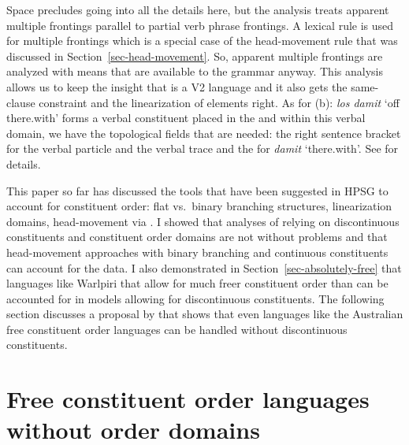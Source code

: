 \documentclass[output=paper
                ,modfonts
                ,nonflat
	        ,collection
	        ,collectionchapter
	        ,collectiontoclongg
 	        ,biblatex
                ,babelshorthands
                ,newtxmath
                ,draftmode
                ,colorlinks, citecolor=brown
]{./langsci/langscibook}
\begin{document}
\zl 
Space precludes going into all the details here, but the analysis treats apparent multiple frontings parallel to
partial verb phrase frontings. A lexical rule is used for multiple frontings which is a special case
of the head-movement rule that was discussed in Section~\ref{sec-head-movement}. So, apparent
multiple frontings are analyzed with means that are available to the grammar anyway. This analysis
allows us to keep the insight that  is a V2 language and it also gets the same-clause constraint
and the linearization of elements right. As for (b): \emph{los damit} `off there.with' forms
a verbal constituent placed in the \vf and within this verbal domain, we have the topological fields that are needed:
the right sentence bracket for the verbal particle and the verbal trace and the \nf for
\emph{damit} `there.with'. See  for details.




This paper so far has discussed the tools that have been suggested in HPSG to account for constituent
order: flat vs.\ binary branching structures, linearization domains, head-movement via \dsl. I
showed that analyses of  relying on discontinuous constituents and constituent order domains
are not without problems and that head-movement approaches with binary branching and continuous
constituents can account for the data. I also demonstrated in Section~\ref{sec-absolutely-free} that
languages like Warlpiri that allow for much freer constituent order than  can be accounted
for in models allowing for discontinuous constituents. The following section discusses a proposal by \citet{Bender2008a} that shows that even
languages like the Australian free constituent order languages can be handled without discontinuous constituents.

\section{Free constituent order languages without order domains}
\label{sec-free-without-domains}
\end{document}
